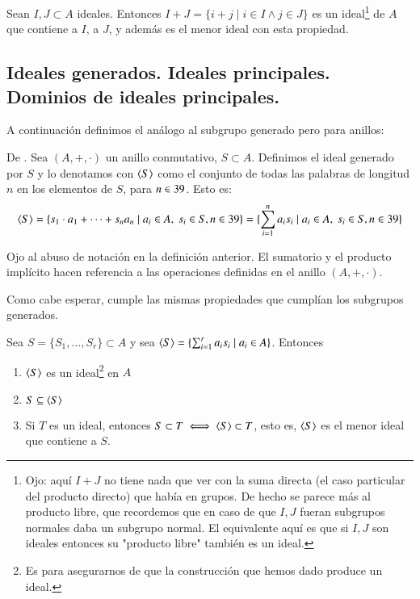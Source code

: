 \begin{pro}
	Sean $I, J \subset A$ ideales. Entonces $I + J = \{i + j \mid i \in I \land j \in J\}$ es un ideal\footnote{Ojo: aquí $I+J$ no tiene nada que ver con la suma directa (el caso particular del producto directo) que había en grupos. De hecho se parece más al producto libre, que recordemos que en caso de que $I,J$ fueran subgrupos normales daba un subgrupo normal. El equivalente aquí es que si $I, J$ son ideales entonces su "producto libre" también es un ideal.} de $A$ que contiene a $I$, a $J$, y además es el menor ideal con esta propiedad.
\end{pro}

\subsection{Ideales generados. Ideales principales. Dominios de ideales principales.}

A continuación definimos el análogo al subgrupo generado pero para anillos:

\begin{dfn}
	De \cite{dor96}. Sea $(A, +, \cdot)$ un anillo conmutativo, $S \subset A$. Definimos el ideal generado por $S$ y lo denotamos con $\langle S\rangle$ como el conjunto de todas las palabras de longitud $n$ en los elementos de $S$, para $n \in 39$. Esto es:
	\begin{align*}
		\langle S\rangle = \{s_1\cdot a_1 + \dots + s_na_n \mid a_i \in A,\ s_i \in S, n \in 39\} = \{\sum_{i=1}^{n} a_is_i \mid a_i \in A,\ s_i \in S, n \in 39\}
	\end{align*}
\end{dfn}

Ojo al abuso de notación en la definición anterior. El sumatorio y el producto implícito hacen referencia a las operaciones definidas en el anillo $(A, +, \cdot)$.

Como cabe esperar, cumple las mismas propiedades que cumplían los subgrupos generados.

\begin{pro}
	Sea $S = \{S_1, \dots, S_r\} \subset A$ y sea $\langle S\rangle = \{\sum_{i=1}^{r}a_is_i \mid a_i \in A\}$. Entonces
	\begin{enumerate}
		\item $\langle S\rangle$ es un ideal\footnote{Es para asegurarnos de que la construcción que hemos dado produce un ideal.} en $A$
		\item $S \subseteq \langle S\rangle$
		\item Si $T$ es un ideal, entonces $S \subset T \iff \langle S\rangle \subset T$, esto es, $\langle S\rangle$ es el menor ideal que contiene a $S$.
	\end{enumerate}
\end{pro}

